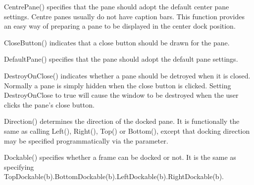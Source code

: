
CentrePane() specifies that the pane should adopt the default center pane settings.  Centre panes usually do not have caption bars.  This function provides an easy way of preparing a pane to be displayed in the center dock position.

\label{wxauipaneinfoclosebutton}


CloseButton() indicates that a close button should be drawn for the pane.

\label{wxauipaneinfodefaultpane}


DefaultPane() specifies that the pane should adopt the default pane settings.

\label{wxauipaneinfodestroyonclose}


DestroyOnClose() indicates whether a pane should be detroyed when it is closed.  Normally a pane is simply hidden when the close button is clicked.  Setting DestroyOnClose to true will cause the window to be destroyed when the user clicks the pane's close button.

\label{wxauipaneinfodirection}


Direction() determines the direction of the docked pane.  It is functionally the same as calling Left(), Right(), Top() or Bottom(), except that docking direction may be specified programmatically via the parameter.

\label{wxauipaneinfodock}



\label{wxauipaneinfodockable}


Dockable() specifies whether a frame can be docked or not.  It is the same as specifying TopDockable(b).BottomDockable(b).LeftDockable(b).RightDockable(b).


